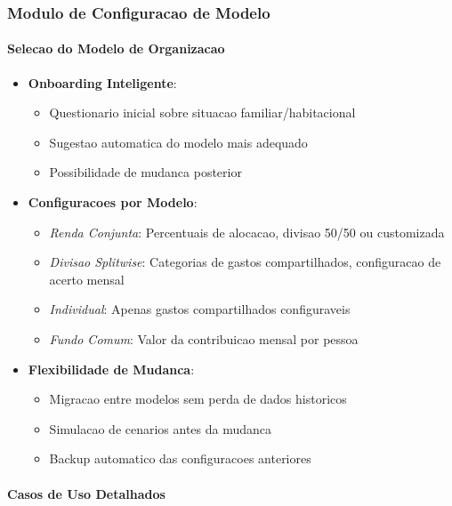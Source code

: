 \subsubsection{Modulo de Configuracao de Modelo}

\paragraph{Selecao do Modelo de Organizacao}
\begin{itemize}
    \item \textbf{Onboarding Inteligente}:
    \begin{itemize}
        \item Questionario inicial sobre situacao familiar/habitacional
        \item Sugestao automatica do modelo mais adequado
        \item Possibilidade de mudanca posterior
    \end{itemize}
    
    \item \textbf{Configuracoes por Modelo}:
    \begin{itemize}
        \item \textit{Renda Conjunta}: Percentuais de alocacao, divisao 50/50 ou customizada
        \item \textit{Divisao Splitwise}: Categorias de gastos compartilhados, configuracao de acerto mensal
        \item \textit{Individual}: Apenas gastos compartilhados configuraveis
        \item \textit{Fundo Comum}: Valor da contribuicao mensal por pessoa
    \end{itemize}
    
    \item \textbf{Flexibilidade de Mudanca}:
    \begin{itemize}
        \item Migracao entre modelos sem perda de dados historicos
        \item Simulacao de cenarios antes da mudanca
        \item Backup automatico das configuracoes anteriores
    \end{itemize}
\end{itemize}

\paragraph{Casos de Uso Detalhados}


